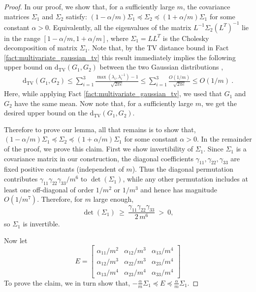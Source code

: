 \documentclass[10pt]{article} %
\theoremstyle{plain}
\newcommand{\dtv}{\mathrm{d_{TV}}}
\begin{document}
\begin{proof}
	In our proof, we show that, for a sufficiently large $m$, the covariance matrices $\Sigma_1$ and $\Sigma_2$ satisfy: $ (1 - \alpha/m) \Sigma_1 \preceq \Sigma_2 \preceq (1 + \alpha/m) \Sigma_1$ for some constant $\alpha>0$. Equivalently, all the eigenvalues of the matrix $L^{-1}\Sigma_2(L^T)^{-1}$ lie in the range $[1-\alpha/m , 1 + \alpha/m]$, where $\Sigma_1=LL^T$ is the Cholesky decomposition of matrix $\Sigma_1$. Note that, by the TV distance bound in Fact \ref{fact:multivariate_gaussian_tv} this result immediately implies the following upper bound on $\dtv(G_1, G_2)$ between the two Gaussian distributions ,
	\begin{align*}
		\dtv(G_1, G_2) \leq \sum_{i=1}^{3}\frac{\max(\lambda_i,\lambda^{-1}_i)-1}{\sqrt{2\pi e}} \leq \sum_{i=1}^{3}\frac{O(1/m)}{\sqrt{2\pi e}} \leq O(1/m)~.
	\end{align*}
    Here, while applying Fact \ref{fact:multivariate_gaussian_tv}, we used that $G_1$ and $G_2$ have the same mean.
	 Now note that, for a sufficiently large  $m$, we get the desired upper bound on the $\dtv(G_1, G_2)$.
	
	Therefore to prove our lemma, all that remains is to show that, $ (1 - \alpha/m) \Sigma_1 \preceq \Sigma_2 \preceq (1 + \alpha/m) \Sigma_1$ for some constant $\alpha>0$. In the remainder of the proof, we prove this claim. First we show invertibility of $\Sigma_1$. Since $\Sigma_1$ is a covariance matrix in our construction, the diagonal coefficients $\gamma_{11},\gamma_{22},\gamma_{33}$ are fixed positive constants (independent of $m$). Thus the diagonal permutation contributes $\gamma_{11}\gamma_{22}\gamma_{33}/m^6$ to $\det(\Sigma_1)$, while any other permutation includes at least one off-diagonal of order $1/m^2$ or $1/m^3$ and hence has magnitude $O(1/m^7)$. Therefore, for $m$ large enough,
\[
\det(\Sigma_1)\ \ge\ \frac{\gamma_{11}\gamma_{22}\gamma_{33}}{2\,m^6}\ >\ 0,
\]
so $\Sigma_1$ is invertible.
    
	
    Now let 
	\begin{equation}
		E=\begin{bmatrix}
			\alpha_{11}/m^2 & \alpha_{12}/m^3 & \alpha_{13}/m^4\\
			\alpha_{12}/m^3 & \alpha_{22}/m^3 & \alpha_{23}/m^4 \\
			\alpha_{13}/m^4 & \alpha_{23}/m^4 & \alpha_{33}/m^4
		\end{bmatrix}  
	\end{equation}
	To prove the claim, we in turn show that, $-\frac{\alpha}{m} \Sigma_1\preceq E\preceq \frac{\alpha}{m} \Sigma_1$. 


\end{proof}
\end{document}

